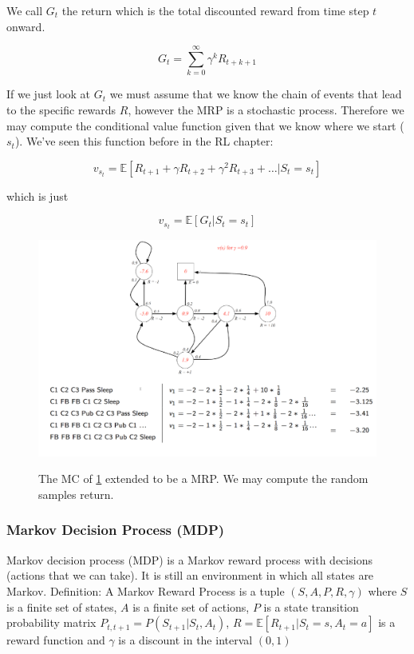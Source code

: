 \documentclass[main]{subfiles}
\begin{document}
We call $G_t$ the return which is the total discounted reward from time step $t$ onward.

\begin{equation}
    G_t = \sum_{k=0}^\infty \gamma^k R_{t+k+1}
\end{equation}

If we just look at $G_t$ we must assume that we know the chain of events that lead to the specific rewards $R$, 
however the MRP is a stochastic process. 
Therefore we may compute the conditional value function given that we know where we start ($s_t$).
We've seen this function before in the RL chapter:

\begin{equation}
    v_{s_t} = \mathbb{E}[R_{t+1} + \gamma R_{t+2} + \gamma^2 R_{t+3} + \dots| S_t = s_t]
\end{equation}

which is just

\begin{equation}
    v_{s_t} = \mathbb{E}[G_t|S_t = s_t]
\end{equation}


\begin{figure}[H]
	\centering
	\includegraphics[width=0.9\linewidth]{08_ReinforcementLearning/figures/mrp-example.png}
	\label{fig:mrp-example}
	\caption{The MC of \ref{fig:mrp-example} extended to be a MRP. We may compute the random samples return.}
\end{figure}



\subsubsection{Markov Decision Process (MDP)}
Markov decision process (MDP) is a Markov reward process with decisions (actions that we can take). It is still an environment in which all states are Markov.
Definition: A Markov Reward Process is a tuple $(S, A, P, R, \gamma) $ where
$S$ is a finite set of states, 
$A$ is a finite set of actions, 
$P$ is a state transition probability matrix $P_{t,t+1} = P(S_{t+1}|S_t, A_t)$,
$R = \mathbb{E}[R_{t+1}|S_t=s, A_t=a]$ is a reward function and
$\gamma$ is a discount in the interval $(0,1)$
\end{document}
